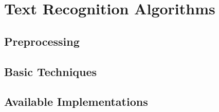 \chapter{Text Recognition Algorithms}

\section{Preprocessing}

\section{Basic Techniques}

\section{Available Implementations}